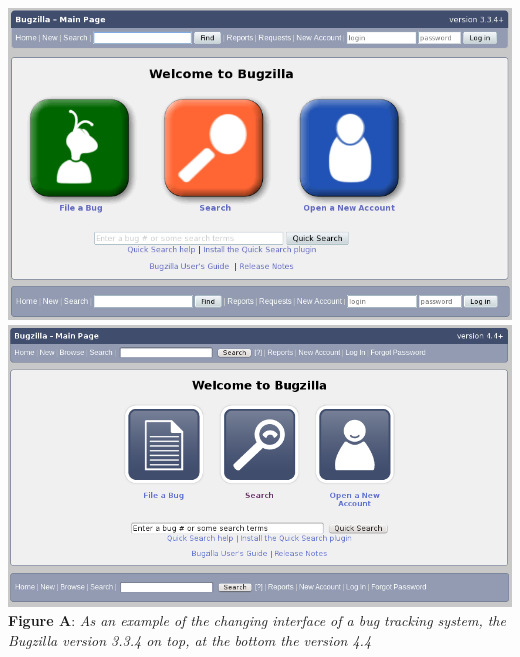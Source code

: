 \includegraphics[width=1.0\textwidth]{bugzilla334} \\\includegraphics[width=1.0\textwidth]{bugzilla44}  \\\textbf{Figure A}: \textit{As an example of the changing interface of a bug tracking system, the Bugzilla version 3.3.4 on top, at the bottom the version 4.4}
\newpage

